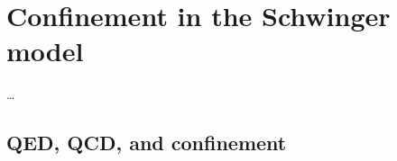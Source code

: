 \documentclass[../main.tex]{subfiles} %
\begin{document}
\chapter{Confinement in the Schwinger model} \label{chap:Confinement}

\ldots



\section{QED, QCD, and confinement}

\lipsum[1-2]
\end{document}
